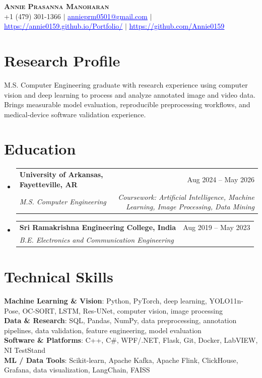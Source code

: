 \documentclass[letterpaper,10pt]{article}
\makeatletter
\newcommand{\resumeSubheading}[4]{\vspace{1pt}\item\begin{tabular*}{0.985\textwidth}[t]{l@{\extracolsep{\fill}}r}\textbf{#1} & #2 \\ \textit{\small#3} & \textit{\small#4} \\ \end{tabular*}\vspace{1pt}}
\newcommand{\resumeSubHeadingListStart}{\begin{itemize}[leftmargin=0.0in,label={}]}
\newcommand{\resumeSubHeadingListEnd}{\end{itemize}\vspace{-2pt}}
\makeatother
\begin{document}
\begin{center}
  \textbf{\Large \scshape Annie Prasanna Manoharan}\\ \vspace{2pt}
  \small +1 (479) 301-1366 $|$ \href{mailto:annieprm0501@gmail.com}{\textcolor{blue}{\underline{annieprm0501@gmail.com}}} $|$ \href{https://annie0159.github.io/Portfolio/}{\textcolor{blue}{\underline{https://annie0159.github.io/Portfolio/}}} $|$ \href{https://github.com/Annie0159}{\textcolor{blue}{\underline{https://github.com/Annie0159}}}
\end{center}\vspace{-6pt}
\section{Research Profile}
\small{M.S. Computer Engineering graduate with research experience using computer vision and deep learning to process and analyze annotated image and video data. Brings measurable model evaluation, reproducible preprocessing workflows, and medical-device software validation experience.}
\vspace{-3pt}
\section{Education}
\resumeSubHeadingListStart
  \resumeSubheading{University of Arkansas, Fayetteville, AR}{Aug 2024 -- May 2026}{M.S. Computer Engineering}{Coursework: Artificial Intelligence, Machine Learning, Image Processing, Data Mining}
  \resumeSubheading{Sri Ramakrishna Engineering College, India}{Aug 2019 -- May 2023}{B.E. Electronics and Communication Engineering}{}
\resumeSubHeadingListEnd
\section{Technical Skills}
\begin{itemize}[leftmargin=0.0in,label={}]
\small{\item{\textbf{Machine Learning \& Vision}: Python, PyTorch, deep learning, YOLO11n-Pose, OC-SORT, LSTM, Res-UNet, computer vision, image processing \\ \textbf{Data \& Research}: SQL, Pandas, NumPy, data preprocessing, annotation pipelines, data validation, feature engineering, model evaluation \\ \textbf{Software \& Platforms}: C++, C\#, WPF/.NET, Flask, Git, Docker, LabVIEW, NI TestStand \\ \textbf{ML / Data Tools}: Scikit-learn, Apache Kafka, Apache Flink, ClickHouse, Grafana, data visualization, LangChain, FAISS}}
\end{itemize}\vspace{-5pt}
\end{document}
